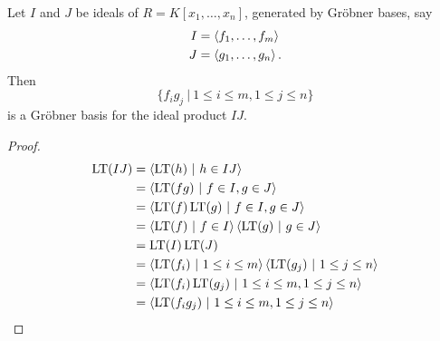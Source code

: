 \begin{theorem}
  \label{thm_groebner_basis_product}
  Let $I$ and $J$ be ideals of $R = K[x_1, \ldots, x_n]$, generated by Gr\"obner bases, say
  \begin{align*}
    I &= \left\langle f_1, \ldots, f_m \right\rangle \\
    J &= \left\langle g_1, \ldots, g_n \right\rangle.
  \end{align*}
  Then
  \[ \{ f_ig_j ~|~ 1 \leq i \leq m, 1 \leq j \leq n \} \]
  is a Gr\"obner basis for the ideal product $IJ$.
\end{theorem}
\begin{proof}
  \begin{align*}
    \operatorname{LT}(IJ)
      &= \left\langle  \operatorname{LT}(h) ~|~ h \in IJ  \right\rangle \\
      &= \left\langle  \operatorname{LT}(fg) ~|~ f \in I, g \in J  \right\rangle \\
      &= \left\langle  \operatorname{LT}(f)\operatorname{LT}(g) ~|~ f \in I, g \in J  \right\rangle \\
      &= \left\langle  \operatorname{LT}(f) ~|~ f \in I  \right\rangle \left\langle  \operatorname{LT}(g) ~|~ g \in J  \right\rangle \\
      &= \operatorname{LT}(I) \operatorname{LT}(J) \\
      &= \left\langle  \operatorname{LT}(f_i) ~|~ 1 \leq i \leq m  \right\rangle \left\langle  \operatorname{LT}(g_j) ~|~ 1 \leq j \leq n  \right\rangle \\
      &= \left\langle  \operatorname{LT}(f_i) \operatorname{LT}(g_j) ~|~ 1 \leq i \leq m, 1 \leq j \leq n  \right\rangle \\
      &= \left\langle  \operatorname{LT}(f_i g_j) ~|~ 1 \leq i \leq m, 1 \leq j \leq n  \right\rangle
  \end{align*}
\end{proof}

